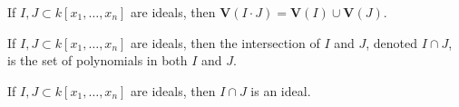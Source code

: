 \documentclass[crop=false,class=book,oneside]{standalone}
\begin{document}
                \begin{theorem}
                    If $I,J\subset k[x_1,\hdots ,x_n]$
                    are ideals, then
                    $\mathbf{V}(I\cdot J)=\mathbf{V}(I)\cup\mathbf{V}(J)$.
                \end{theorem}
                \begin{definition}
                    If $I,J\subset k[x_1,\hdots ,x_n]$ are ideals,
                    then the intersection of $I$ and $J$,
                    denoted $I\cap J$, is the set of polynomials
                    in both $I$ and $J$.
                \end{definition}
                \begin{theorem}
                    If $I,J\subset k[x_1,\hdots ,x_n]$ are ideals,
                    then $I\cap J$ is an ideal.
                \end{theorem}
\end{document}
